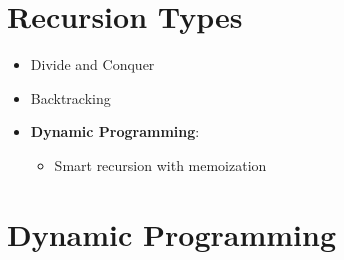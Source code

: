 \documentclass[12pt]{article}
\date{March 11, 2021}
\begin{document}
\maketitle

\section{Recursion Types}

\begin{itemize}
    \item Divide and Conquer
    \item Backtracking
    \item \textbf{Dynamic Programming}:
    \begin{itemize}
        \item Smart recursion with memoization
    \end{itemize}
\end{itemize}

\section{Dynamic Programming}
\end{document}
